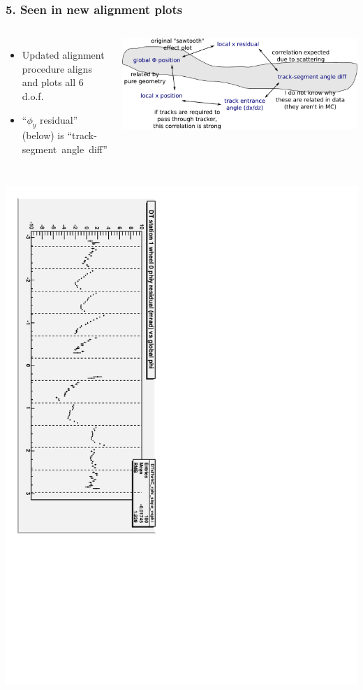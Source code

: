 \documentclass[compress]{beamer}
\begin{document}
\begin{frame}
\frametitle{5. Seen in new alignment plots}

\begin{columns}
\begin{itemize}
\item Updated alignment procedure aligns and plots all 6 d.o.f.
\item ``$\phi_y$ residual'' (below) is \mbox{``track-segment angle diff''\hspace{-1 cm}}
\end{itemize}

\includegraphics[width=\linewidth]{map_of_correlations6.pdf}
\end{columns}

\vfill
\includegraphics[height=\linewidth, angle=90]{possible_acoplanarity.pdf}
\end{frame}
\end{document}
